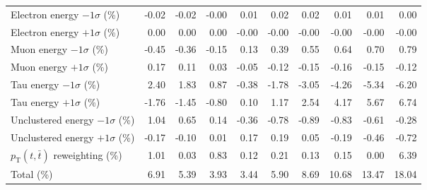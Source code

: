 \begin{table}[htbp]
{\begin{tabular}{lrrrrrrrrr}
Electron energy $-1\sigma$ (\%) & -0.02 & -0.02 & -0.00 & 0.01 & 0.02 & 0.02 & 0.01 & 0.01 & 0.00 \\ 
Electron energy $+1\sigma$ (\%) & 0.00 & 0.00 & 0.00 & -0.00 & -0.00 & -0.00 & -0.00 & -0.00 & -0.00 \\ 
Muon energy $-1\sigma$ (\%) & -0.45 & -0.36 & -0.15 & 0.13 & 0.39 & 0.55 & 0.64 & 0.70 & 0.79 \\ 
Muon energy $+1\sigma$ (\%) & 0.17 & 0.11 & 0.03 & -0.05 & -0.12 & -0.15 & -0.16 & -0.15 & -0.12 \\ 
Tau energy $-1\sigma$ (\%) & 2.40 & 1.83 & 0.87 & -0.38 & -1.78 & -3.05 & -4.26 & -5.34 & -6.20 \\ 
Tau energy $+1\sigma$ (\%) & -1.76 & -1.45 & -0.80 & 0.10 & 1.17 & 2.54 & 4.17 & 5.67 & 6.74 \\ 
Unclustered energy $-1\sigma$ (\%) & 1.04 & 0.65 & 0.14 & -0.36 & -0.78 & -0.89 & -0.83 & -0.61 & -0.28 \\ 
Unclustered energy $+1\sigma$ (\%) & -0.17 & -0.10 & 0.01 & 0.17 & 0.19 & 0.05 & -0.19 & -0.46 & -0.72 \\ 
$p_\mathrm{T}(t,\bar{t})$ reweighting (\%) & 1.01 & 0.03 & 0.83 & 0.12 & 0.21 & 0.13 & 0.15 & 0.00 & 6.39 \\ 
\hline 
Total (\%) & 6.91  & 5.39  & 3.93  & 3.44  & 5.90  & 8.69  & 10.68  & 13.47  & 18.04 \\ 
\hline 
\end{tabular}
}
\end{table}
